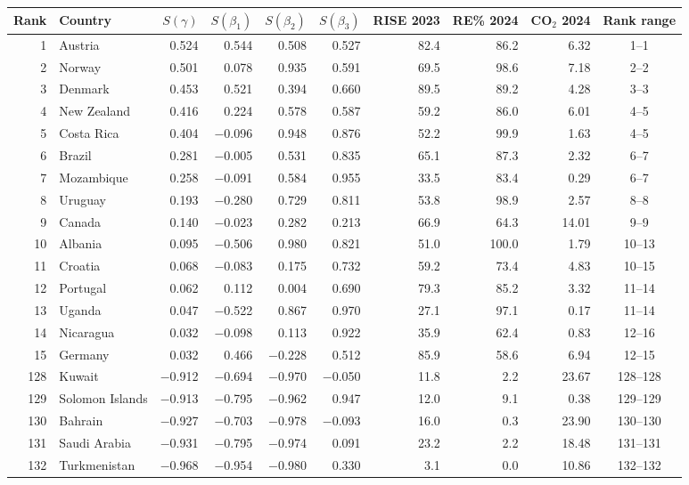\begin{tabular}{rlrrrrrrrc}
\toprule
Rank & Country & $S(\gamma)$ & $S(\beta_1)$ & $S(\beta_2)$ & $S(\beta_3)$ & RISE 2023 & RE\% 2024 & CO$_2$ 2024 & Rank range \\
\midrule
1 & Austria & 0.524 & 0.544 & 0.508 & 0.527 & 82.4 & 86.2 & 6.32 & 1--1 \\
2 & Norway & 0.501 & 0.078 & 0.935 & 0.591 & 69.5 & 98.6 & 7.18 & 2--2 \\
3 & Denmark & 0.453 & 0.521 & 0.394 & 0.660 & 89.5 & 89.2 & 4.28 & 3--3 \\
4 & New Zealand & 0.416 & 0.224 & 0.578 & 0.587 & 59.2 & 86.0 & 6.01 & 4--5 \\
5 & Costa Rica & 0.404 & $-$0.096 & 0.948 & 0.876 & 52.2 & 99.9 & 1.63 & 4--5 \\
6 & Brazil & 0.281 & $-$0.005 & 0.531 & 0.835 & 65.1 & 87.3 & 2.32 & 6--7 \\
7 & Mozambique & 0.258 & $-$0.091 & 0.584 & 0.955 & 33.5 & 83.4 & 0.29 & 6--7 \\
8 & Uruguay & 0.193 & $-$0.280 & 0.729 & 0.811 & 53.8 & 98.9 & 2.57 & 8--8 \\
9 & Canada & 0.140 & $-$0.023 & 0.282 & 0.213 & 66.9 & 64.3 & 14.01 & 9--9 \\
10 & Albania & 0.095 & $-$0.506 & 0.980 & 0.821 & 51.0 & 100.0 & 1.79 & 10--13 \\
11 & Croatia & 0.068 & $-$0.083 & 0.175 & 0.732 & 59.2 & 73.4 & 4.83 & 10--15 \\
12 & Portugal & 0.062 & 0.112 & 0.004 & 0.690 & 79.3 & 85.2 & 3.32 & 11--14 \\
13 & Uganda & 0.047 & $-$0.522 & 0.867 & 0.970 & 27.1 & 97.1 & 0.17 & 11--14 \\
14 & Nicaragua & 0.032 & $-$0.098 & 0.113 & 0.922 & 35.9 & 62.4 & 0.83 & 12--16 \\
15 & Germany & 0.032 & 0.466 & $-$0.228 & 0.512 & 85.9 & 58.6 & 6.94 & 12--15 \\
\midrule
128 & Kuwait & $-$0.912 & $-$0.694 & $-$0.970 & $-$0.050 & 11.8 & 2.2 & 23.67 & 128--128 \\
129 & Solomon Islands & $-$0.913 & $-$0.795 & $-$0.962 & 0.947 & 12.0 & 9.1 & 0.38 & 129--129 \\
130 & Bahrain & $-$0.927 & $-$0.703 & $-$0.978 & $-$0.093 & 16.0 & 0.3 & 23.90 & 130--130 \\
131 & Saudi Arabia & $-$0.931 & $-$0.795 & $-$0.974 & 0.091 & 23.2 & 2.2 & 18.48 & 131--131 \\
132 & Turkmenistan & $-$0.968 & $-$0.954 & $-$0.980 & 0.330 & 3.1 & 0.0 & 10.86 & 132--132 \\
\bottomrule
\end{tabular}
